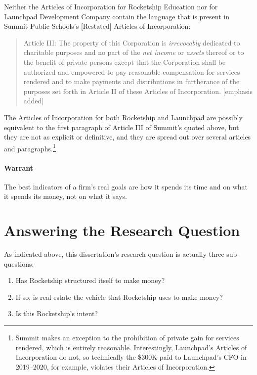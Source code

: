 Neither the Articles of Incorporation for Rocketship Education nor for Launchpad Development Company contain the language that is present in Summit Public Schools's [Restated] Articles of Incorporation:
\begin{quotation}\noindent%
Article III: The property of this Corporation is \textit{irrevocably} dedicated to charitable purposes and no part of the \textit{net income} or \textit{assets} thereof or to the benefit of private persons except that the Corporation shall be authorized and empowered to pay reasonable compensation for services rendered and to make payments and distributions in furtherance of the purposes set forth in Article II of these Articles of Incorporation. [emphasis added]
\end{quotation}
The Articles of Incorporation for both Rocketship and Launchpad are possibly equivalent to the first paragraph of Article III of Summit's quoted above, but they are not as explicit or definitive, and they are spread out over several articles and paragraphs.\footnote{Summit makes an exception to the prohibition of private gain for services rendered, which is entirely reasonable. Interestingly, Launchpad's Articles of Incorporation do not, so technically the \$300K paid to Launchpad's CFO \parencite[7]{zotero-16512} in 2019–2020, for example, violates their Articles of Incorporation.}

\paragraph{Warrant}
The best indicators of a firm's real goals are how it spends its time and on what it spends its money, not on what it says.

\section{Answering the Research Question}%
\label{sec:answ-rese-quest}\indent%

As indicated above, this dissertation's research question is actually three sub-questions:
\begin{enumerate}
  \item Has Rocketship structured itself to make money?
  \item If so, is real estate the vehicle that Rocketship uses to make money?
  \item Is this Rocketship's intent?
\end{enumerate}

